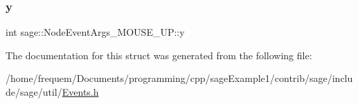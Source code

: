 \mbox{\label{structsage_1_1NodeEventArgs__MOUSE__UP_ae88d867152a43ee7546de5a84b27da0b}} 
\subsubsection{\texorpdfstring{y}{y}}
{\footnotesize\ttfamily int sage\+::\+Node\+Event\+Args\+\_\+\+M\+O\+U\+S\+E\+\_\+\+U\+P\+::y}



The documentation for this struct was generated from the following file\+:\begin{DoxyCompactItemize}
\item 
/home/frequem/\+Documents/programming/cpp/sage\+Example1/contrib/sage/include/sage/util/\mbox{\hyperlink{Events_8h}{Events.\+h}}\end{DoxyCompactItemize}
